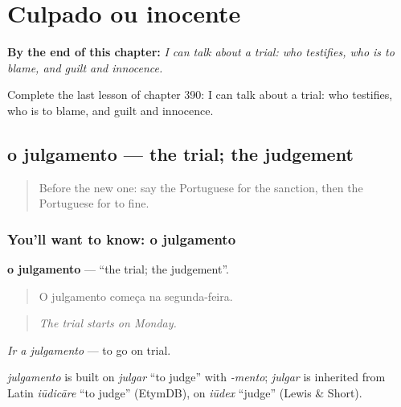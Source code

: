 
\chapter{Culpado ou inocente}
\label{ch:pt-culpado-ou-inocente}

\begin{chapteropening}
\textbf{By the end of this chapter:} \emph{I can talk about a trial: who testifies, who is to blame, and guilt and innocence.}

Complete the last lesson of chapter 390: I can talk about a trial: who testifies, who is to blame, and guilt and innocence.
\end{chapteropening}

\section[o julgamento]{o julgamento — the trial; the judgement}

\label{lesson:PT-C390-julgamento}



\begin{quote}
Before the new one: say the Portuguese for the sanction, then the Portuguese for to fine.
\end{quote}

\subsection*{You'll want to know: o julgamento}
\textbf{o julgamento} — \textquotedblleft{}the trial; the judgement\textquotedblright{}.

\begin{quote}
O julgamento começa na segunda-feira.
\end{quote}

\begin{quote}
\emph{The trial starts on Monday.}
\end{quote}

\emph{Ir a julgamento} — to go on trial.

\begin{cousinweb}
\emph{julgamento} is built on \emph{julgar} \textquotedblleft{}to judge\textquotedblright{} with \emph{-mento}; \emph{julgar} is inherited from Latin \emph{iūdicāre} \textquotedblleft{}to judge\textquotedblright{} (EtymDB), on \emph{iūdex} \textquotedblleft{}judge\textquotedblright{} (Lewis \& Short).
\end{cousinweb}

